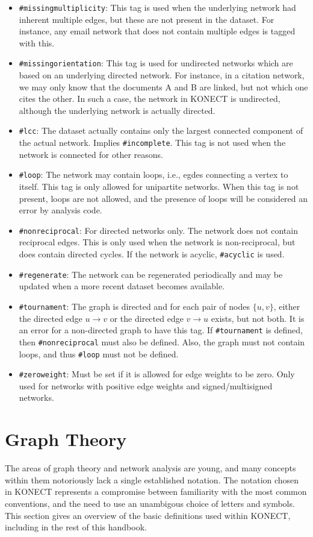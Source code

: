 \documentclass{article}
\begin{document}
\begin{itemize}
\item \texttt{\#missingmultiplicity}:  This tag is used when the
  underlying network had inherent multiple edges, but these are
  not present in the dataset.  For instance, any email network
  that does not contain multiple edges is tagged with this. 
\item \texttt{\#missingorientation}: This tag is used for
  undirected networks which are based on an underlying
  directed network.  For instance, in a citation network, we
  may only know that the documents A and B are linked, but not
  which one cites the other.  In such a case, the network in
  KONECT is undirected, although the underlying network is
  actually directed.
\item \texttt{\#lcc}:  The dataset actually contains only the
  largest connected component of the actual network.  Implies
  \texttt{\#incomplete}.  This tag is not used when the network
  is connected for other reasons. 
\item \texttt{\#loop}: The network may contain loops, i.e.,
  egdes connecting a vertex to itself.  This tag is only
  allowed for unipartite networks.  When this tag is not
  present, loops are not allowed, and the presence of loops
  will be considered an error by analysis code.
\item \texttt{\#nonreciprocal}:  For directed networks only.
  The network does not contain reciprocal edges.  This is only
  used when the network is non-reciprocal, but does contain
  directed cycles.  If the network is acyclic,
  \texttt{\#acyclic} is used. 
\item \texttt{\#regenerate}: The network can be regenerated
  periodically and may be updated when a more recent dataset
  becomes available.
\item \texttt{\#tournament}:  The graph is directed and for each
  pair of nodes $\{u,v\}$, either the directed edge $u \rightarrow v$ or
  the directed edge $v \rightarrow u$ exists, but not both.  It
  is an error for a non-directed graph to have this tag.  If
  \texttt{\#tournament} is defined, then
  \texttt{\#nonreciprocal} must also be defined.  Also, the graph must
  not contain loops, and thus
  \texttt{\#loop} must not be defined. 
\item \texttt{\#zeroweight}:  Must be set if it is allowed for edge
  weights to be zero. Only used for networks with positive edge
  weights and signed/multisigned networks. 
\end{itemize}

\section{Graph Theory}
\label{sec:definitions}
The areas of graph theory and network analysis are young, and
many concepts within them notoriously lack a single established notation.  The
notation chosen in KONECT represents a compromise between familiarity
with the most common conventions, and the need to use an unambigous
choice of letters and symbols.  This section gives an overview of the
basic definitions used within KONECT, including in the rest of this handbook. 
\end{document}
